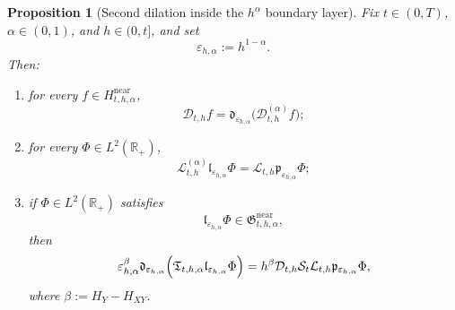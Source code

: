 \documentclass[11pt,a4paper]{amsart}
\theoremstyle{plain}
\newtheorem{proposition}[theorem]{Proposition}
\theoremstyle{definition}
\theoremstyle{remark}
\newcommand{\R}{\mathbb{R}}
\begin{document}
\begin{proposition}[Second dilation inside the \(h^\alpha\) boundary layer]
\label{prop:two-scale-factorization}
Fix \(t\in(0,T)\), \(\alpha\in(0,1)\), and \(h\in(0,t]\), and set
\[
\varepsilon_{h,\alpha}:=h^{1-\alpha}.
\]
Then:
\begin{enumerate}[label=(\roman*)]
\item for every \(f\in H_{t,h,\alpha}^{\mathrm{near}}\),
\begin{equation}\label{eq:two-scale-D}
\mathcal D_{t,h}f
=
\mathfrak d_{\varepsilon_{h,\alpha}}\bigl(\mathcal D_{t,h}^{(\alpha)}f\bigr);
\end{equation}
\item for every \(\Phi\in L^2(\R_+)\),
\begin{equation}\label{eq:two-scale-L}
\mathcal L_{t,h}^{(\alpha)}\mathfrak l_{\varepsilon_{h,\alpha}}\Phi
=
\mathcal L_{t,h}\mathfrak p_{\varepsilon_{h,\alpha}}\Phi;
\end{equation}
\item if \(\Phi\in L^2(\R_+)\) satisfies
\[
\mathfrak l_{\varepsilon_{h,\alpha}}\Phi\in \mathfrak G_{t,h,\alpha}^{\mathrm{near}},
\]
then
\begin{equation}\label{eq:two-scale-transfer}
\varepsilon_{h,\alpha}^{\beta}
\mathfrak d_{\varepsilon_{h,\alpha}}
\Bigl(
\mathfrak T_{t,h,\alpha}\mathfrak l_{\varepsilon_{h,\alpha}}\Phi
\Bigr)
=
h^\beta
\mathcal D_{t,h}\mathcal S_t\mathcal L_{t,h}\mathfrak p_{\varepsilon_{h,\alpha}}\Phi,
\end{equation}
where \(\beta:=H_Y-H_{XY}\).
\end{enumerate}
\end{proposition}
\end{document}
